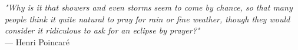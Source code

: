 \begin{flushright}
\emph{"Why is it that showers and even storms seem to come by chance, so that many people think it quite natural to pray for rain or fine weather, though they would consider it ridiculous to ask for an eclipse by prayer?"}\\
 — Henri Poincaré
\end{flushright}